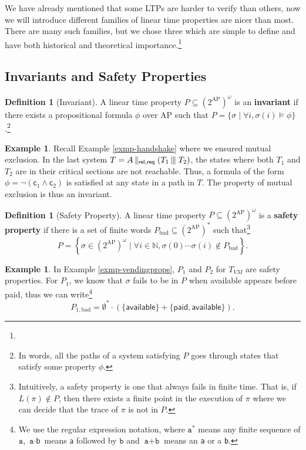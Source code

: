 \documentclass{tufte-handout} %
\theoremstyle{definition}
\newtheorem{defn}[thm]{Definition}
\newtheorem{exmp}[thm]{Example}
\theoremstyle{remark}
\newcommand{\bra}[1]{\left(#1\right)}
\newcommand{\N}{\mathbb{N}}
\newcommand{\0}{\textsf{0}}
\newcommand{\1}{\textsf{1}}
\newcommand{\AP}{\text{AP}}
\newcommand{\tmid}{\kern-0.20ex\mid\kern-0.20ex\mid\kern-0.20ex \mid}
\newcommand{\dmid}{\kern-0.20ex\mid\kern-0.20ex\mid}
\begin{document}
We have already mentioned that some LTPs are harder to verify than others, now we will introduce different families of linear time properties are nicer than most. There are many such families, but we chose three which are simple to define and have both historical and theoretical importance.\footnote{}%
\subsection{Invariants and Safety Properties}
\begin{defn}[Invariant]
	A linear time property $P \subseteq (2^{\AP})^{\omega}$ is an \textbf{invariant} if there exists a propositional formula $\phi$ over $\AP$ such that $P = \{\sigma \mid \forall i, \sigma(i) \vDash \phi\}$.\footnote{In words, all the paths of a system satisfying $P$ goes through states that satisfy some property $\phi$.}
\end{defn}
\begin{exmp}
	Recall Example \ref{exmp-handshake} where we ensured mutual exclusion. In the last system $T = A \dmid_{\textsf{rel}, \textsf{req}} (T_1 \tmid T_2)$, the states where both $T_1$ and $T_2$ are in their critical sections are not reachable. Thus, a formula of the form $\phi = \neg(\textsf{c}_1 \wedge \textsf{c}_2)$ is satisfied at any state in a path in $T$. The property of mutual exclusion is thus an invariant.
\end{exmp}
\begin{defn}[Safety Property] 
	A linear time property $P \subseteq (2^{\AP})^{\omega}$ is a \textbf{safety property} if there is a set of finite words $P_{\text{bad}}\subseteq (2^{\AP})^*$ such that\footnote{Intuitively, a safety property is one that always fails in finite time. That is, if $L(\pi) \notin P$, then there exists a finite point in the execution of $\pi$ where we can decide that the trace of $\pi$ is not in $P$.}
	\[P = \left\{\sigma \in (2^{\AP})^{\omega} \mid \forall i \in \N, \sigma(0)\cdots \sigma(i) \notin P_{\text{bad}}\right\}.\]
\end{defn}
\begin{exmp}
	In Example \ref{exmp-vendingprops}, $P_1$ and $P_2$ for $T_{VM}$ are safety properties. For $P_1$, we know that $\sigma$ fails to be in $P$ when \textsf{available} appears before \textsf{paid}, thus we can write\footnote{We use the regular expression notation, where $\texttt{a}^*$ means any finite sequence of $\texttt{a}$, $\texttt{a}\cdot\textsf{b}$ means $\textsf{a}$ followed by $\texttt{b}$ and $\texttt{a} + \texttt{b}$ means an \texttt{a} or a \texttt{b}.}
	\[P_{1,\text{bad}} = \emptyset^* \cdot \bra{\{\textsf{available}\} + \{\textsf{paid}, \textsf{available}\}}.\]
\end{exmp}
\end{document}
